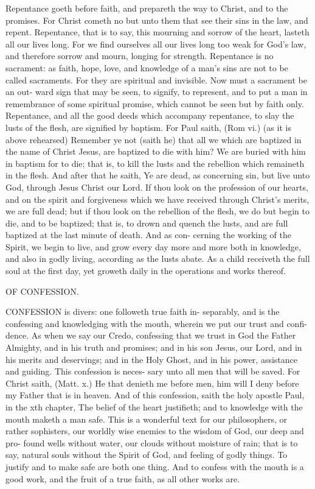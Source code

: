 \documentclass{custom}
\begin{document}
Repentance goeth before faith, and prepareth the way
to Christ, and to the promises. For Christ cometh no
but unto them that see their sins in the law, and repent. 
Repentance, that is to say, this mourning and sorrow of 
the heart, lasteth all our lives long. For we find ourselves 
all our lives long too weak for God's law, and therefore 
sorrow and mourn, longing for strength. Repentance is 
no sacrament: as faith, hope, love, and knowledge of a 
man's sins are not to be called sacraments. For they are 
spiritual and invisible. Now must a sacrament be an out- 
ward sign that may be seen, to signify, to represent, and 
to put a man in remembrance of some spiritual promise, 
which cannot be seen but by faith only. Repentance, 
and all the good deeds which accompany repentance, to 
slay the lusts of the flesh, are signified by baptism. For 
Paul saith, (Rom vi.) (as it is above rehearsed) Remember 
ye not (saith he) that all we which are baptized in the 
name of Christ Jesus, are baptized to die with him? We 
are buried with him in baptism for to die; that is, to kill
the lusts and the rebellion which remaineth in the flesh.
And after that he saith, Ye are dead, as concerning sin, 
but live unto God, through Jesus Christ our Lord. If 
thou look on the profession of our hearts, and on the 
spirit and forgiveness which we have received through 
Christ's merits, we are full dead; but if thou look on the 
rebellion of the flesh, we do but begin to die, and to be 
baptized; that is, to drown and quench the lusts, and are 
full baptized at the last minute of death. And as con- 
cerning the working of the Spirit, we begin to live, and 
grow every day more and more both in knowledge, and 
also in godly living, according as the lusts abate. As a 
child receiveth the full soul at the first day, yet groweth 
daily in the operations and works thereof. 


OF CONFESSION. 

CONFESSION is divers: one followeth true faith in- 
separably, and is the confessing and knowledging 
with the mouth, wherein we put our trust and confi- 
dence. As when we say our Credo, confessing that we 
trust in God the Father Almighty, and in his truth and 
promises; and in his son Jesus, our Lord, and in his 
merits and deservings; and in the Holy Ghost, and in his 
power, assistance and guiding. This confession is neces- 
sary unto all men that will be saved. For Christ saith, 
(Matt. x.) He that denieth me before men, him will I 
deny before my Father that is in heaven. And of this 
confession, saith the holy apostle Paul, in the xth chapter, 
The belief of the heart justifieth; and to knowledge with 
the mouth maketh a man safe. This is a wonderful text 
for our philosophers, or rather sophisters, our worldly 
wise enemies to the wisdom of God, our deep and pro- 
found wells without water, our clouds without moisture of 
rain; that is to say, natural souls without the Spirit of 
God, and feeling of godly things. To justify and to 
make safe are both one thing. And to confess with the 
mouth is a good work, and the fruit of a true faith, as all 
other works are. 
\end{document}
